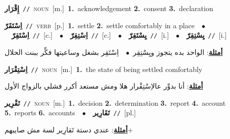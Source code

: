 \documentclass[10pt,a4paper,twoside]{article} %
\begin{document}
\begin{multicols}{2}
{\setlength\topsep{0pt}\textbf{\foreignlanguage{arabic}{إِقْرَار}}\ {\color{gray}\texttt{//}\color{black}}\ \textsc{noun}\ [m.]\ \textbf{1.}~acknowledgement  \textbf{2.}~consent  \textbf{3.}~declaration\ } \vspace{2mm}

{\setlength\topsep{0pt}\textbf{\foreignlanguage{arabic}{اِسْتَقَرّ}}\ {\color{gray}\texttt{//}\color{black}}\ \textsc{verb}\ [p.]\ \textbf{1.}~settle  \textbf{2.}~settle comfortably in a place\ \ $\bullet$\ \ \setlength\topsep{0pt}\textbf{\foreignlanguage{arabic}{اِسْتَقِرّ}}\ {\color{gray}\texttt{//}\color{black}}\ [c.]\ \ $\bullet$\ \ \setlength\topsep{0pt}\textbf{\foreignlanguage{arabic}{اِسْتِقِرّ}}\ {\color{gray}\texttt{//}\color{black}}\ [c.]\ \ $\bullet$\ \ \setlength\topsep{0pt}\textbf{\foreignlanguage{arabic}{يِسْتَقِرّ}}\ {\color{gray}\texttt{//}\color{black}}\ [i.]\ \ $\bullet$\ \ \setlength\topsep{0pt}\textbf{\foreignlanguage{arabic}{يِسْتِقِرّ}}\ {\color{gray}\texttt{//}\color{black}}\ [i.]\  \begin{flushright}\color{gray}\foreignlanguage{arabic}{\textbf{\underline{\foreignlanguage{arabic}{أمثلة}}}: الواحد بده يتجوز ويِسْتِقِر\ $\bullet$\ \  اِسْتَقِر بشغل وساعيتها فكِّر ببنت الحلال}\end{flushright}\color{black}} \vspace{2mm}

{\setlength\topsep{0pt}\textbf{\foreignlanguage{arabic}{اِسْتِقْرَار}}\ {\color{gray}\texttt{//}\color{black}}\ \textsc{noun}\ [m.]\ \textbf{1.}~the state of being settled comfortably\  \begin{flushright}\color{gray}\foreignlanguage{arabic}{\textbf{\underline{\foreignlanguage{arabic}{أمثلة}}}: أنا بدوِّر عالاِسْتِقْرار هلا ومش مستعد أكرر فشلي بالزواج الأول}\end{flushright}\color{black}} \vspace{2mm}

{\setlength\topsep{0pt}\textbf{\foreignlanguage{arabic}{تَقْرِير}}\ {\color{gray}\texttt{//}\color{black}}\ \textsc{noun}\ [m.]\ \textbf{1.}~decision  \textbf{2.}~determination  \textbf{3.}~report  \textbf{4.}~account  \textbf{5.}~reports  \textbf{6.}~accounts\ \ $\bullet$\ \ \setlength\topsep{0pt}\textbf{\foreignlanguage{arabic}{تَقَارِير}}\ {\color{gray}\texttt{//}\color{black}}\ [pl.]\  \begin{flushright}\color{gray}\foreignlanguage{arabic}{\textbf{\underline{\foreignlanguage{arabic}{أمثلة}}}: عندي دستة تَقارِير لسة مش صايبهم+}\end{flushright}\color{black}} \vspace{2mm}


\end{multicols}
\end{document}
